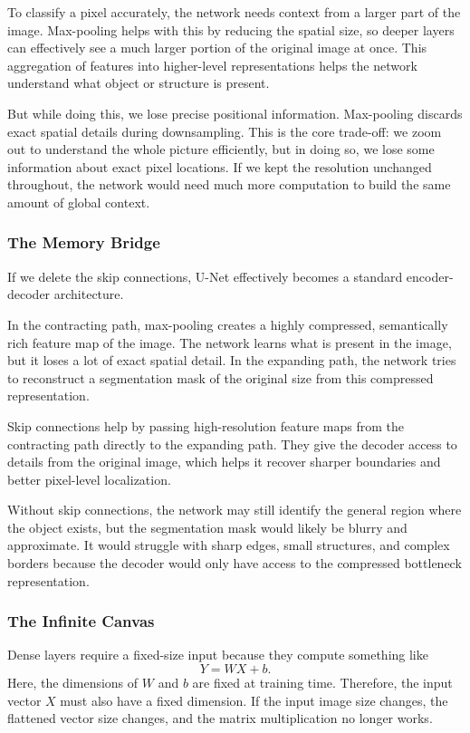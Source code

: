 \documentclass[11pt,a4paper]{article}
\begin{document}
To classify a pixel accurately, the network needs context from a larger part of the image. Max-pooling helps with this by reducing the spatial size, so deeper layers can effectively see a much larger portion of the original image at once. This aggregation of features into higher-level representations helps the network understand what object or structure is present.

But while doing this, we lose precise positional information. Max-pooling discards exact spatial details during downsampling. This is the core trade-off: we zoom out to understand the whole picture efficiently, but in doing so, we lose some information about exact pixel locations. If we kept the resolution unchanged throughout, the network would need much more computation to build the same amount of global context.

\subsubsection{The Memory Bridge}
If we delete the skip connections, U-Net effectively becomes a standard encoder-decoder architecture.

In the contracting path, max-pooling creates a highly compressed, semantically rich feature map of the image. The network learns what is present in the image, but it loses a lot of exact spatial detail. In the expanding path, the network tries to reconstruct a segmentation mask of the original size from this compressed representation.

Skip connections help by passing high-resolution feature maps from the contracting path directly to the expanding path. They give the decoder access to details from the original image, which helps it recover sharper boundaries and better pixel-level localization.

Without skip connections, the network may still identify the general region where the object exists, but the segmentation mask would likely be blurry and approximate. It would struggle with sharp edges, small structures, and complex borders because the decoder would only have access to the compressed bottleneck representation.

\subsubsection{The Infinite Canvas}
Dense layers require a fixed-size input because they compute something like
\[
Y = WX + b.
\]
Here, the dimensions of \(W\) and \(b\) are fixed at training time. Therefore, the input vector \(X\) must also have a fixed dimension. If the input image size changes, the flattened vector size changes, and the matrix multiplication no longer works.
\end{document}

